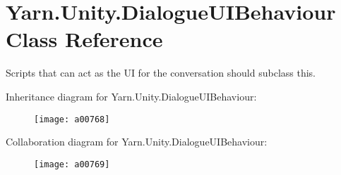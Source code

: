 \hypertarget{a00085}{\section{Yarn.\-Unity.\-Dialogue\-U\-I\-Behaviour Class Reference}
\label{a00085}
}


Scripts that can act as the U\-I for the conversation should subclass this.  




Inheritance diagram for Yarn.\-Unity.\-Dialogue\-U\-I\-Behaviour\-:
\nopagebreak
\begin{figure}[H]
\begin{center}
\leavevmode
\texttt{[image: a00768]}
\end{center}
\end{figure}


Collaboration diagram for Yarn.\-Unity.\-Dialogue\-U\-I\-Behaviour\-:
\nopagebreak
\begin{figure}[H]
\begin{center}
\leavevmode
\texttt{[image: a00769]}
\end{center}
\end{figure}
